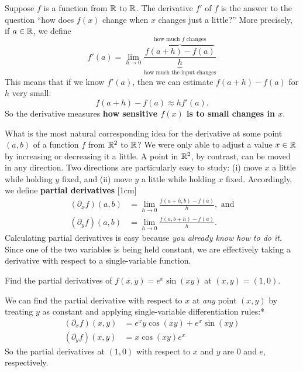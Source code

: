 \documentclass[svgnames]{report}
\begin{document}


  Suppose $f$ is a function from $\mathbb{R}$ to $\mathbb{R}$. The derivative $f'$ of
  $f$ is the answer to the question ``how does $f(x)$ change when $x$
  changes just a little?'' More precisely, if $a\in \mathbb{R}$, we define
  \[
    f'(a) = \lim_{h \to 0} \frac{\overbrace{f(a+h)-f(a)}^{\text{how
          much $f$ changes}}}{\underbrace{h}_{\text{how much the input
          changes}}}
  \]
  This means that if we know $f'(a)$, then we can estimate
  $f(a+h) - f(a)$ for $h$ very small:
  \[
    f(a+h) - f(a) \approx h
    f'(a). 
  \]
  So the derivative measures \textbf{how sensitive $f(x)$ is to small
    changes in $x$}.
  
  What is the most natural corresponding idea for the derivative at
  some point $(a,b)$ of a function $f$ from $\mathbb{R}^2$ to $\mathbb{R}$? We were
  only able to adjust a value $x\in \mathbb{R}$ by increasing or decreasing it
  a little. A point in $\mathbb{R}^2$, by contrast, can be moved in any
  direction. Two directions are particularly easy to study: (i) move
  $x$ a little while holding $y$ fixed, and (ii) move $y$ a little
  while holding $x$ fixed. Accordingly, we define \textbf{partial
    derivatives} [1cm]
  \begin{align*}
    (\partial_x f)(a,b) &= \lim_{h \to 0}\frac{f(a+h,b) - f(a)}{h},
                          \text{ and} \\
    (\partial_y f)(a,b) &= \lim_{h \to 0}\frac{f(a,b+h) - f(a)}{h}. 
  \end{align*}
  Calculating partial derivatives is easy because \textit{you already
    know how to do it}. Since one of the two variables is being held
  constant, we are effectively taking a derivative with respect to a
  single-variable function.

  \begin{example}{}{}
    Find the partial derivatives of $f(x,y) = e^x \sin (xy)$ at $(x,y)
    = (1,0)$. 
  \end{example}

  \begin{solution}
    We can find the partial derivative with respect to $x$ at
    \textit{any} point $(x,y)$ by treating $y$ as constant and
    applying single-variable differentiation rules:* 
    \begin{align*}
      (\partial_xf)(x,y) &= e^{x} y \cos\left(x y\right) + e^{x}
                           \sin\left(x y\right) \\  
      (\partial_yf)(x,y)  &= x \cos\left(x y\right) e^{x}
    \end{align*}
    So the partial derivatives at $(1,0)$ with respect to $x$ and $y$
    are 0 and $e$, respectively.
  \end{solution}
\end{document}
